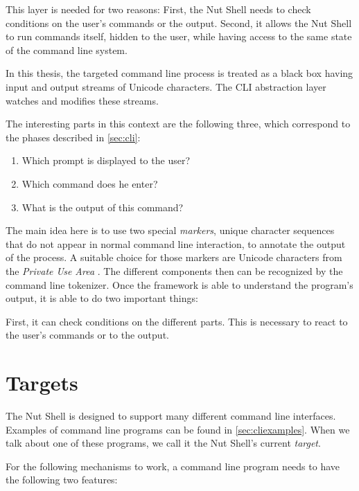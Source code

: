 \documentclass[paper=a4,twoside,abstract=on,cleardoublepage=empty,numbers=noenddot,toc=bib,toc=listof,12pt,appendixprefix=true]{scrreprt}
\begin{document}
This layer is needed for two reasons: First, the Nut Shell needs to check conditions on the user's commands or the output. Second, it allows the Nut Shell to run commands itself, hidden to the user, while having access to the same state of the command line system.

In this thesis, the targeted command line process is treated as a black box having input and output streams of Unicode characters. The CLI abstraction layer watches and modifies these streams.

The interesting parts in this context are the following three, which correspond to the phases described in \cref{sec:cli}:

\begin{enumerate}
    \item Which prompt is displayed to the user?
    \item Which command does he enter?
    \item What is the output of this command?
\end{enumerate}



The main idea here is to use two special \emph{markers}, unique character sequences that do not appear in normal command line interaction, to annotate the output of the process. A suitable choice for those markers are Unicode characters from the \emph{Private Use Area} \cite[p. 558]{unicode6.2}. The different components then can be recognized by the command line tokenizer. Once the framework is able to understand the program's output, it is able to do two important things:

First, it can check conditions on the different parts. This is necessary to react to the user's commands or to the output.

\section{Targets}
\label{sec:targets}

The Nut Shell is designed to support many different command line interfaces. Examples of command line programs can be found in \cref{sec:cliexamples}. When we talk about one of these programs, we call it the Nut Shell's current \emph{target}.

For the following mechanisms to work, a command line program needs to have the following two features:
\end{document}
